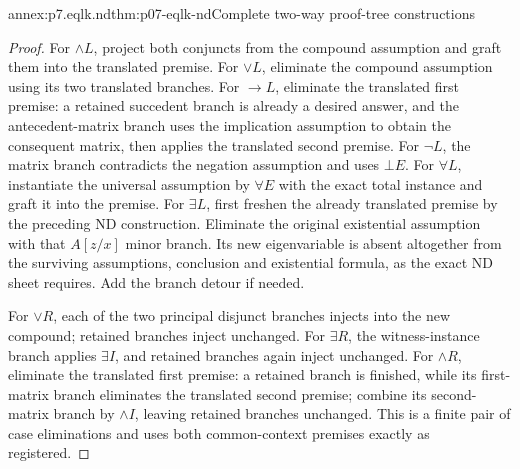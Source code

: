 \begin{annexitem}{annex:p7.eqlk.nd}{thm:p07-eqlk-nd}{Complete two-way proof-tree constructions}
\begin{proof}
For \(\land L\), project both conjuncts from the compound assumption
and graft them into the translated premise. For \(\lor L\), eliminate
the compound assumption using its two translated branches. For \(\to L\),
eliminate the translated first premise: a retained succedent branch is
already a desired answer, and the antecedent-matrix branch uses the
implication assumption to obtain the consequent matrix, then applies
the translated second premise. For \(\neg L\), the matrix branch
contradicts the negation assumption and uses \(\bot E\).
For \(\forall L\), instantiate the universal assumption by \(\forall E\)
with the exact total instance and graft it into the premise.
For \(\exists L\), first freshen the already translated premise by
the preceding ND construction. Eliminate the original existential
assumption with that \(A[z/x]\) minor branch. Its new eigenvariable
is absent altogether from the surviving assumptions, conclusion and
existential formula, as the exact ND sheet requires. Add the branch
detour if needed.

For \(\lor R\), each of the two principal disjunct branches injects
into the new compound; retained branches inject unchanged. For
\(\exists R\), the witness-instance branch applies \(\exists I\),
and retained branches again inject unchanged. For \(\land R\), eliminate
the translated first premise: a retained branch is finished, while
its first-matrix branch eliminates the translated second premise;
combine its second-matrix branch by \(\land I\), leaving retained
branches unchanged. This is a finite pair of case eliminations and
uses both common-context premises exactly as registered.


\end{proof}
\end{annexitem}
